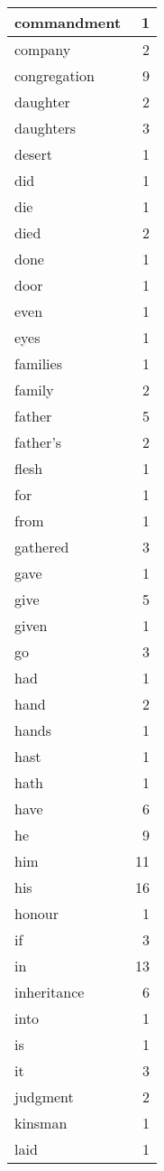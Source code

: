 \begin{center}
\begin{longtable}{l|r}
commandment & 1\\ \hline 
company & 2\\ \hline 
congregation & 9\\ \hline 
daughter & 2\\ \hline 
daughters & 3\\ \hline 
desert & 1\\ \hline 
did & 1\\ \hline 
die & 1\\ \hline 
died & 2\\ \hline 
done & 1\\ \hline 
door & 1\\ \hline 
even & 1\\ \hline 
eyes & 1\\ \hline 
families & 1\\ \hline 
family & 2\\ \hline 
father & 5\\ \hline 
father's & 2\\ \hline 
flesh & 1\\ \hline 
for & 1\\ \hline 
from & 1\\ \hline 
gathered & 3\\ \hline 
gave & 1\\ \hline 
give & 5\\ \hline 
given & 1\\ \hline 
go & 3\\ \hline 
had & 1\\ \hline 
hand & 2\\ \hline 
hands & 1\\ \hline 
hast & 1\\ \hline 
hath & 1\\ \hline 
have & 6\\ \hline 
he & 9\\ \hline 
him & 11\\ \hline 
his & 16\\ \hline 
honour & 1\\ \hline 
if & 3\\ \hline 
in & 13\\ \hline 
inheritance & 6\\ \hline 
into & 1\\ \hline 
is & 1\\ \hline 
it & 3\\ \hline 
judgment & 2\\ \hline 
kinsman & 1\\ \hline 
laid & 1\\ \hline 

\end{longtable}
\end{center}
